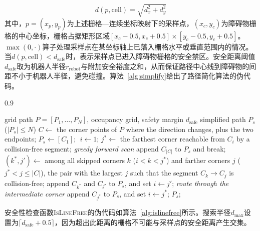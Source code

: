 \documentclass[lettersize,journal]{IEEEtran}
\begin{document}
\begin{equation}
d(p, \mathrm{cell}) = \sqrt{d_x^2 + d_y^2}
\label{eq:dist}
\end{equation}
其中，$p = (x_p, y_p)$为上述栅格—连续坐标映射下的采样点，$(x_c, y_c)$为障碍物栅格的中心坐标，栅格占据矩形区域$[x_c - 0.5, x_c + 0.5] \times [y_c - 0.5, y_c + 0.5]$。$\max(0, \cdot)$算子处理采样点在某坐标轴上已落入栅格水平或垂直范围内的情况。当$d(p, \mathrm{cell}) < d_{\mathrm{safe}}$时，表示采样点已进入障碍物栅格的安全禁区。安全距离阈值$d_{\mathrm{safe}}$取为机器人半径$r_{\mathrm{robot}}$与附加安全裕度之和，从而保证路径中心线到障碍物的间距不小于机器人半径，避免碰撞。算法~\textcolor{blue}{\ref{alg:simplify}}给出了路径简化算法的伪代码。
\begin{algorithm}[!t]
\caption{Safety-distance-aware path simplification}
\label{alg:simplify}
\begin{spacing}{0.9}
\begin{algorithmic}[1]
\REQUIRE grid path $P = [P_1, \ldots, P_N]$, occupancy grid, safety margin $d_{\mathrm{safe}}$
\ENSURE simplified path $P_s$ ($|P_s| \leq N$)
\STATE $C \gets$ the corner points of $P$ where the direction changes, plus the two endpoints;
\STATE $P_s \gets [C_1]$; $\; i \gets 1$;
\STATE $j^{*} \gets$ the farthest corner reachable from $C_i$ by a collision-free segment; \quad\textit{greedy forward scan}
\STATE append $C_{|C|}$ to $P_s$ and break;
\ENDIF
\STATE $(k^{*}, j') \gets$ among all skipped corners $k$ ($i < k < j^{*}$) and farther corners $j$ ($j^{*} < j \leq |C|$), the pair with the largest $j$ such that the segment $C_k \to C_j$ is collision-free;
\STATE append $C_{k^{*}}$ and $C_{j'}$ to $P_s$, and set $i \gets j'$; \quad\textit{route through the intermediate corner}
\ELSE
\STATE append $C_{j^{*}}$ to $P_s$, and set $i \gets j^{*}$;
\ENDIF
\ENDWHILE
\RETURN $P_s$;
\end{algorithmic}
\end{spacing}
\end{algorithm}

安全性检查函数\textsc{IsLineFree}的伪代码如算法~\textcolor{blue}{\ref{alg:islinefree}}所示。搜索半径$d_{\max}$设置为$\lceil d_{\mathrm{safe}} + 0.5 \rceil$，因为超出此距离的栅格不可能与采样点的安全距离产生交集。
\end{document}
